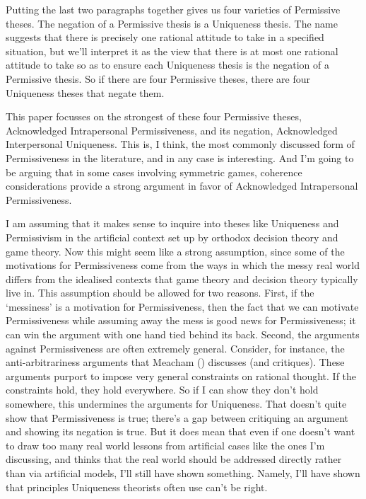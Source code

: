 \documentclass[
  10pt,
  letterpaper,
  DIV=11,
  numbers=noendperiod,
  twoside]{scrartcl}
\begin{document}
Putting the last two paragraphs together gives us four varieties of
Permissive theses. The negation of a Permissive thesis is a Uniqueness
thesis. The name suggests that there is precisely one rational attitude
to take in a specified situation, but we'll interpret it as the view
that there is at most one rational attitude to take so as to ensure each
Uniqueness thesis is the negation of a Permissive thesis. So if there
are four Permissive theses, there are four Uniqueness theses that negate
them.

This paper focusses on the strongest of these four Permissive theses,
Acknowledged Intrapersonal Permissiveness, and its negation,
Acknowledged Interpersonal Uniqueness. This is, I think, the most
commonly discussed form of Permissiveness in the literature, and in any
case is interesting. And I'm going to be arguing that in some cases
involving symmetric games, coherence considerations provide a strong
argument in favor of Acknowledged Intrapersonal Permissiveness.

I am assuming that it makes sense to inquire into theses like Uniqueness
and Permissivism in the artificial context set up by orthodox decision
theory and game theory. Now this might seem like a strong assumption,
since some of the motivations for Permissiveness come from the ways in
which the messy real world differs from the idealised contexts that game
theory and decision theory typically live in. This assumption should be
allowed for two reasons. First, if the `messiness' is a motivation for
Permissiveness, then the fact that we can motivate Permissiveness while
assuming away the mess is good news for Permissiveness; it can win the
argument with one hand tied behind its back. Second, the arguments
against Permissiveness are often extremely general. Consider, for
instance, the anti-arbitrariness arguments that Meacham
() discusses (and critiques). These
arguments purport to impose very general constraints on rational
thought. If the constraints hold, they hold everywhere. So if I can show
they don't hold somewhere, this undermines the arguments for Uniqueness.
That doesn't quite show that Permissiveness is true; there's a gap
between critiquing an argument and showing its negation is true. But it
does mean that even if one doesn't want to draw too many real world
lessons from artificial cases like the ones I'm discussing, and thinks
that the real world should be addressed directly rather than via
artificial models, I'll still have shown something. Namely, I'll have
shown that principles Uniqueness theorists often use can't be right.
\end{document}
